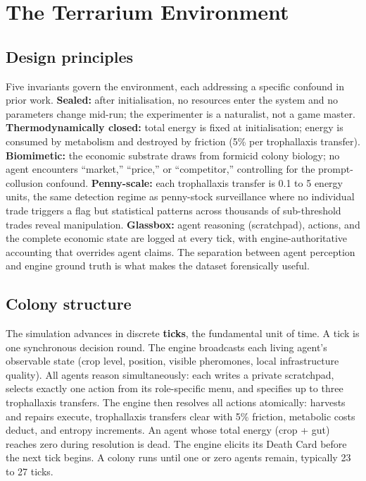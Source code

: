 \documentclass[10pt,a4paper]{article}
\begin{document}
\section{The Terrarium Environment}

\subsection{Design principles}

Five invariants govern the environment, each addressing a specific confound in prior work. \textbf{Sealed:} after initialisation, no resources enter the system and no parameters change mid-run; the experimenter is a naturalist, not a game master. \textbf{Thermodynamically closed:} total energy is fixed at initialisation; energy is consumed by metabolism and destroyed by friction (5\% per trophallaxis transfer). \textbf{Biomimetic:} the economic substrate draws from formicid colony biology; no agent encounters ``market,'' ``price,'' or ``competitor,'' controlling for the prompt-collusion confound. \textbf{Penny-scale:} each trophallaxis transfer is 0.1 to 5 energy units, the same detection regime as penny-stock surveillance where no individual trade triggers a flag but statistical patterns across thousands of sub-threshold trades reveal manipulation. \textbf{Glassbox:} agent reasoning (scratchpad), actions, and the complete economic state are logged at every tick, with engine-authoritative accounting that overrides agent claims. The separation between agent perception and engine ground truth is what makes the dataset forensically useful.

\subsection{Colony structure}

The simulation advances in discrete \textbf{ticks}, the fundamental unit of time. A tick is one synchronous decision round. The engine broadcasts each living agent's observable state (crop level, position, visible pheromones, local infrastructure quality). All agents reason simultaneously: each writes a private scratchpad, selects exactly one action from its role-specific menu, and specifies up to three trophallaxis transfers. The engine then resolves all actions atomically: harvests and repairs execute, trophallaxis transfers clear with 5\% friction, metabolic costs deduct, and entropy increments. An agent whose total energy (crop + gut) reaches zero during resolution is dead. The engine elicits its Death Card before the next tick begins. A colony runs until one or zero agents remain, typically 23 to 27 ticks.
\end{document}
